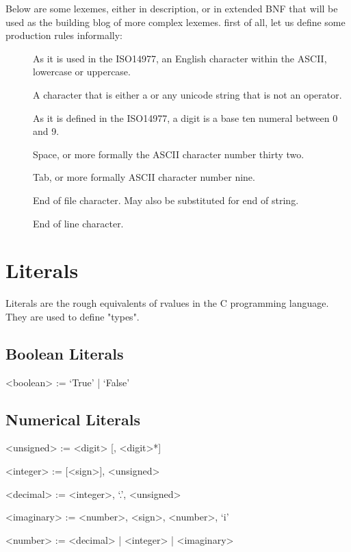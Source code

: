 \documentclass[11pt,a4paper]{book}
\begin{document}
Below are some lexemes, either in description, or in extended BNF that will be used as the building blog of more complex lexemes. first of all, let us define some production rules informally:

\begin{description}
\item[] As it is used in the ISO14977, an English character within the ASCII, lowercase or uppercase.
\item[] A character that is either a  or any unicode string that is not an operator.
\item[] As it is defined in the ISO14977, a digit is a base ten numeral between 0 and 9.
\item[] Space, or more formally the ASCII character number thirty two.
\item[] Tab, or more formally ASCII character number nine.
\item[] End of file character. May also be substituted for end of string.
\item[] End of line character.
\end{description}



\section{Literals}

Literals are the rough equivalents of rvalues in the C programming language. They are used to define "types".

\subsection{Boolean Literals}

\begin{grammar}
<boolean> := `True' | `False'
\end{grammar}

\subsection{Numerical Literals}

\begin{grammar}

<unsigned> := <digit> [, <digit>*]

<integer> := [<sign>], <unsigned>

<decimal> := <integer>, `.', <unsigned>

<imaginary> := <number>, <sign>, <number>, `i'

<number> := <decimal> | <integer> | <imaginary>
\end{grammar}
\end{document}
